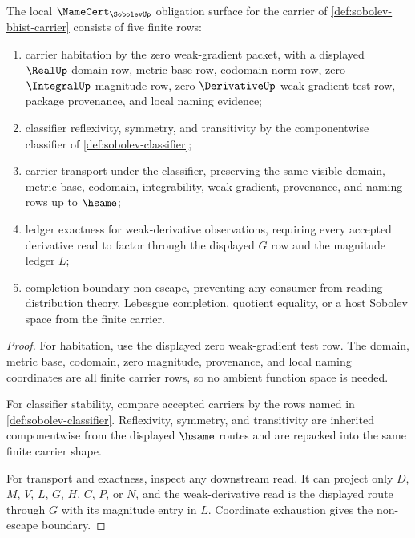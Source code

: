\begin{theorem}
\label{thm:sobolev-namecert-obligation-surface}
The local $\NameCert_{\SobolevUp}$ obligation surface for the carrier of \autoref{def:sobolev-bhist-carrier} consists of five finite rows:
\begin{enumerate}
\item carrier habitation by the zero weak-gradient packet, with a displayed $\RealUp$ domain row, metric base row, codomain norm row, zero $\IntegralUp$ magnitude row, zero $\DerivativeUp$ weak-gradient test row, package provenance, and local naming evidence;
\item classifier reflexivity, symmetry, and transitivity by the componentwise classifier of \autoref{def:sobolev-classifier};
\item carrier transport under the classifier, preserving the same visible domain, metric base, codomain, integrability, weak-gradient, provenance, and naming rows up to $\hsame$;
\item ledger exactness for weak-derivative observations, requiring every accepted derivative read to factor through the displayed $G$ row and the magnitude ledger $L$;
\item completion-boundary non-escape, preventing any consumer from reading distribution theory, Lebesgue completion, quotient equality, or a host Sobolev space from the finite carrier.
\end{enumerate}
\end{theorem}
\begin{proof}
For habitation, use the displayed zero weak-gradient test row. The domain, metric base, codomain, zero magnitude, provenance, and local naming coordinates are all finite carrier rows, so no ambient function space is needed.

For classifier stability, compare accepted carriers by the rows named in \autoref{def:sobolev-classifier}. Reflexivity, symmetry, and transitivity are inherited componentwise from the displayed $\hsame$ routes and are repacked into the same finite carrier shape.

For transport and exactness, inspect any downstream read. It can project only $D$, $M$, $V$, $L$, $G$, $H$, $C$, $P$, or $N$, and the weak-derivative read is the displayed route through $G$ with its magnitude entry in $L$. Coordinate exhaustion gives the non-escape boundary.
\end{proof}

